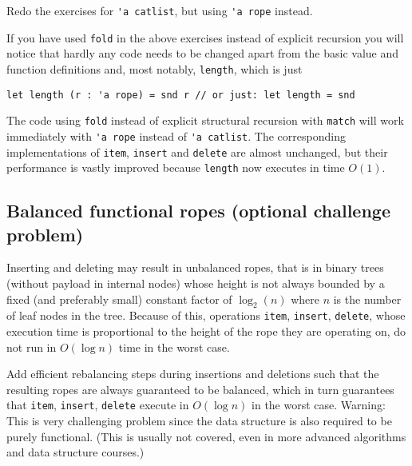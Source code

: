 \documentclass[a4paper,11pt]{article}
\begin{document}
Redo the exercises for \verb|'a catlist|, but using \verb|'a rope| instead.

If you have used \verb|fold| in the above exercises instead of explicit recursion you will notice that hardly any code needs to be changed apart from the basic value and function definitions and, most notably, \verb|length|, which is just
\begin{verbatim}
let length (r : 'a rope) = snd r // or just: let length = snd
\end{verbatim} 
The code using \verb|fold| instead of explicit structural recursion with \verb|match| will work immediately with \verb|'a rope| instead of \verb|'a catlist|.  The corresponding implementations of \verb|item|, \verb|insert| and \verb|delete| are almost unchanged, but their performance is vastly improved because \verb|length| now executes in time $O(1)$.  

\subsection{Balanced functional ropes (optional challenge problem)}

Inserting and deleting may result in unbalanced ropes, that is in binary trees (without payload in internal nodes) whose height is not always bounded by a fixed  (and preferably small) constant factor of $\log_2 (n)$ where $n$ is the number of leaf nodes in the tree.  Because of this, operations \verb|item|, \verb|insert|, \verb|delete|, whose execution time is proportional to the height of the rope they are operating on, do not run in $O(\log n)$ time in the worst case.  

Add efficient rebalancing steps during insertions and deletions such that the resulting ropes are always guaranteed to be balanced, which in turn guarantees that \verb|item|, \verb|insert|, \verb|delete| execute in $O(\log n)$ in the worst case.  Warning: This is very challenging problem since the data structure is also required to be purely functional. (This is usually not covered, even in more advanced algorithms and data structure courses.) 
\end{document}
